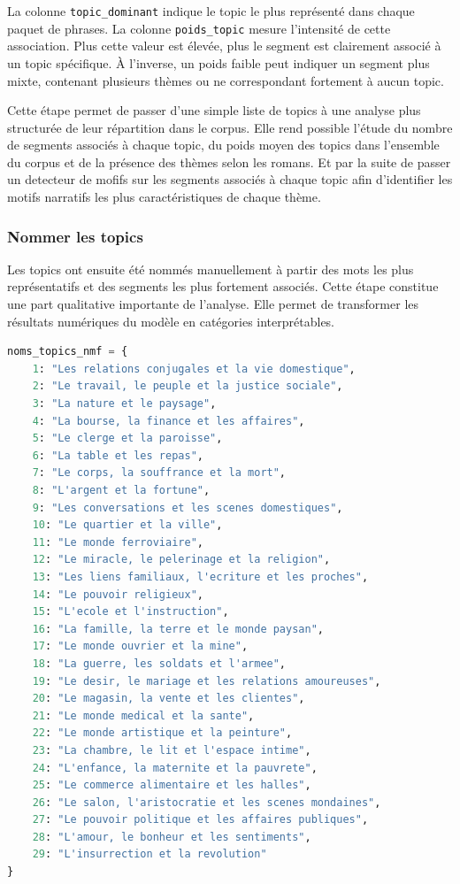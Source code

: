 \documentclass{article}
\begin{document}
La colonne \texttt{topic\_dominant} indique le topic le plus représenté dans chaque paquet de phrases. La colonne \texttt{poids\_topic} mesure l'intensité de cette association. Plus cette valeur est élevée, plus le segment est clairement associé à un topic spécifique. À l'inverse, un poids faible peut indiquer un segment plus mixte, contenant plusieurs thèmes ou ne correspondant fortement à aucun topic.

Cette étape permet de passer d'une simple liste de topics à une analyse plus structurée de leur répartition dans le corpus. Elle rend possible l'étude du nombre de segments associés à chaque topic, du poids moyen des topics dans l'ensemble du corpus et de la présence des thèmes selon les romans. Et par la suite de passer un detecteur de mofifs sur les segments associés à chaque topic afin d'identifier les motifs narratifs les plus caractéristiques de chaque thème.

\subsubsection{Nommer les topics}

Les topics ont ensuite été nommés manuellement à partir des mots les plus représentatifs et des segments les plus fortement associés. Cette étape constitue une part qualitative importante de l'analyse. Elle permet de transformer les résultats numériques du modèle en catégories interprétables.

\begin{lstlisting}[language=Python, caption={Attribution manuelle des noms de topics}]
noms_topics_nmf = {
    1: "Les relations conjugales et la vie domestique",
    2: "Le travail, le peuple et la justice sociale",
    3: "La nature et le paysage",
    4: "La bourse, la finance et les affaires",
    5: "Le clerge et la paroisse",
    6: "La table et les repas",
    7: "Le corps, la souffrance et la mort",
    8: "L'argent et la fortune",
    9: "Les conversations et les scenes domestiques",
    10: "Le quartier et la ville",
    11: "Le monde ferroviaire",
    12: "Le miracle, le pelerinage et la religion",
    13: "Les liens familiaux, l'ecriture et les proches",
    14: "Le pouvoir religieux",
    15: "L'ecole et l'instruction",
    16: "La famille, la terre et le monde paysan",
    17: "Le monde ouvrier et la mine",
    18: "La guerre, les soldats et l'armee",
    19: "Le desir, le mariage et les relations amoureuses",
    20: "Le magasin, la vente et les clientes",
    21: "Le monde medical et la sante",
    22: "Le monde artistique et la peinture",
    23: "La chambre, le lit et l'espace intime",
    24: "L'enfance, la maternite et la pauvrete",
    25: "Le commerce alimentaire et les halles",
    26: "Le salon, l'aristocratie et les scenes mondaines",
    27: "Le pouvoir politique et les affaires publiques",
    28: "L'amour, le bonheur et les sentiments",
    29: "L'insurrection et la revolution"
}
\end{lstlisting}
\end{document}
